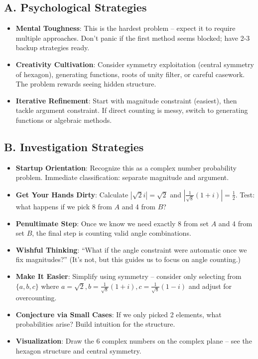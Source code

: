 \documentclass[]{article}
\begin{document}
\begin{strategicbox}
\subsection*{A. Psychological Strategies}
\begin{itemize}[leftmargin=*]
    \item \textbf{Mental Toughness}: This is the hardest problem -- expect it to require multiple approaches. Don't panic if the first method seems blocked; have 2-3 backup strategies ready.
    \item \textbf{Creativity Cultivation}: Consider symmetry exploitation (central symmetry of hexagon), generating functions, roots of unity filter, or careful casework. The problem rewards seeing hidden structure.
    \item \textbf{Iterative Refinement}: Start with magnitude constraint (easiest), then tackle argument constraint. If direct counting is messy, switch to generating functions or algebraic methods.
\end{itemize}

\subsection*{B. Investigation Strategies}
\begin{itemize}[leftmargin=*]
    \item \textbf{Startup Orientation}: Recognize this as a complex number probability problem. Immediate classification: separate magnitude and argument.
    \item \textbf{Get Your Hands Dirty}: Calculate $|\sqrt{2}i| = \sqrt{2}$ and $|\frac{1}{\sqrt{8}}(1+i)| = \frac{1}{2}$. Test: what happens if we pick 8 from $A$ and 4 from $B$?
    \item \textbf{Penultimate Step}: Once we know we need exactly 8 from set $A$ and 4 from set $B$, the final step is counting valid angle combinations.
    \item \textbf{Wishful Thinking}: ``What if the angle constraint were automatic once we fix magnitudes?'' (It's not, but this guides us to focus on angle counting.)
    \item \textbf{Make It Easier}: Simplify using symmetry -- consider only selecting from $\{a, b, c\}$ where $a = \sqrt{2}, b = \frac{1}{\sqrt{8}}(1+i), c = \frac{1}{\sqrt{8}}(1-i)$ and adjust for overcounting.
    \item \textbf{Conjecture via Small Cases}: If we only picked 2 elements, what probabilities arise? Build intuition for the structure.
    \item \textbf{Visualization}: Draw the 6 complex numbers on the complex plane -- see the hexagon structure and central symmetry.
\end{itemize}


\end{strategicbox}
\end{document}
